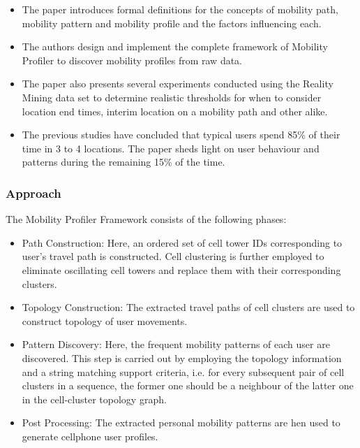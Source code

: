 \begin{itemize}
	
	\item The paper introduces formal definitions for the concepts of mobility path, mobility 
	pattern and mobility profile and the factors influencing each. 
	
	\item The authors design and implement the complete framework of Mobility Profiler to 
	discover mobility profiles from raw data. 
	
	\item The paper also presents several experiments conducted using the Reality Mining data 
	set to determine realistic thresholds for when to consider location end times, interim 
	location on a mobility path and other alike. 
	
	\item The previous studies have concluded that typical users spend 85\% of their time in
	3 to 4 locations. The paper sheds light on user behaviour and patterns during the 
	remaining 15\% of the time. 
	
	 
\end{itemize}

\subsubsection*{Approach}

The Mobility Profiler Framework consists of the following phases: 

\begin{itemize}

	\item Path Construction: Here, an ordered set of cell tower IDs corresponding to 
	user's travel path is constructed. Cell clustering is further employed to eliminate 
	oscillating cell towers and replace them with their corresponding clusters. 
	
	\item Topology Construction: The extracted travel paths of cell clusters are used to 
	construct topology of user movements. 
	
	\item Pattern Discovery: Here, the frequent mobility patterns of each user are discovered. 
	This step is carried out by employing the topology information and a string matching 
	support criteria, i.e. for every subsequent pair of cell clusters in a sequence, the 
	former one should be a neighbour of the latter one in the cell-cluster topology graph. 
	
	\item Post Processing: The extracted personal mobility patterns are hen used to generate
	cellphone user profiles. 
	 
\end{itemize}


